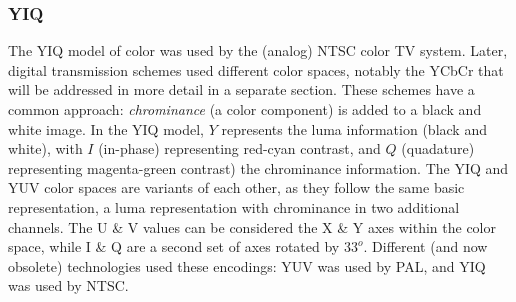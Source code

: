 \documentclass[letterpaper]{article}
\begin{document}
{\subsubsection{YIQ}
The YIQ model of color was used by the (analog) NTSC color TV system. Later, digital transmission schemes used different color spaces, notably the YCbCr that will be addressed in more detail in a separate section. These schemes have a common approach: \textit{chrominance} (a color component) is added to a black and white image. In the YIQ model, $Y$ represents the luma information (black and white), with $I$ (in-phase) representing red-cyan contrast, and $Q$ (quadature) representing magenta-green contrast) the chrominance information.  The YIQ and YUV color spaces are variants of each other, as they follow the same basic representation, a luma representation with chrominance in two additional channels.  The U \& V values can be considered the X \& Y axes within the color space, while I \& Q are a second set of axes rotated by $33^o$. Different (and now obsolete) technologies used these encodings: YUV was used by PAL, and YIQ was used by NTSC.


}
\end{document}
